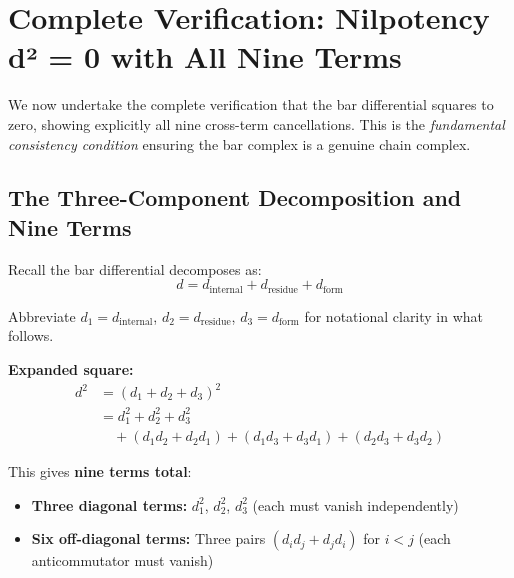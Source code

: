 \section{Complete Verification: Nilpotency d² = 0 with All Nine Terms}
\label{sec:bar-nilpotency-nine-terms-complete}

We now undertake the complete verification that the bar differential squares to zero,
showing explicitly all nine cross-term cancellations. This is the \emph{fundamental
consistency condition} ensuring the bar complex is a genuine chain complex.

\subsection{The Three-Component Decomposition and Nine Terms}

\begin{setup}\label{setup:d-decomposition}
Recall the bar differential decomposes as:
$$d = d_{\text{internal}} + d_{\text{residue}} + d_{\text{form}}$$

Abbreviate $d_1 = d_{\text{internal}}$, $d_2 = d_{\text{residue}}$, $d_3 = d_{\text{form}}$
for notational clarity in what follows.

\textbf{Expanded square:}
\begin{align}
d^2 &= (d_1 + d_2 + d_3)^2 \nonumber\\
&= d_1^2 + d_2^2 + d_3^2 \nonumber\\
&\quad + (d_1 d_2 + d_2 d_1) + (d_1 d_3 + d_3 d_1) + (d_2 d_3 + d_3 d_2) \label{eq:nine-terms}
\end{align}

This gives \textbf{nine terms total}:
\begin{itemize}
\item \textbf{Three diagonal terms:} $d_1^2$, $d_2^2$, $d_3^2$ (each must vanish independently)
\item \textbf{Six off-diagonal terms:} Three pairs $(d_i d_j + d_j d_i)$ for $i < j$
(each anticommutator must vanish)
\end{itemize}
\end{setup}

